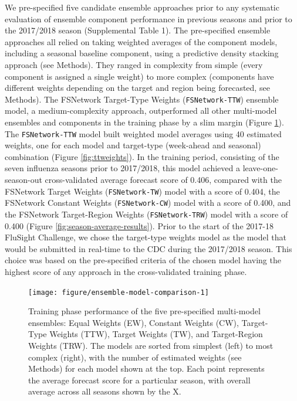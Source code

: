\documentclass{article}\usepackage[]{graphicx}\usepackage[]{color}
\newenvironment{knitrout}{}{} %
\begin{document}
We pre-specified five candidate ensemble approaches prior to any systematic evaluation of ensemble component performance in previous seasons and prior to the 2017/2018 season (Supplemental Table 1).\cite{Reich2017github} 
The pre-specified ensemble approaches all relied on taking weighted averages of the component models, including a seasonal baseline component, using a predictive density stacking approach (see Methods).
They ranged in complexity from simple (every component is assigned a single weight) to more complex (components have different weights depending on the target and region being forecasted, see Methods).
The FSNetwork Target-Type Weights ({\tt FSNetwork-TTW}) ensemble model, a medium-complexity approach, outperformed all other multi-model ensembles and components in the training phase by a slim margin (Figure \ref{fig:ensemble-model-comparison}). 
The {\tt FSNetwork-TTW} model built weighted model averages using 40 estimated weights, one for each model and target-type (week-ahead and seasonal) combination (Figure \ref{fig:ttweights}).
In the training period, consisting of the seven influenza seasons prior to 2017/2018, this model achieved a leave-one-season-out cross-validated average forecast score of 
0.406, 
compared with 
the FSNetwork Target Weights ({\tt FSNetwork-TW}) model with a score of 0.404, 
the FSNetwork Constant Weights ({\tt FSNetwork-CW}) model with a score of 0.400, and 
the FSNetwork Target-Region Weights ({\tt FSNetwork-TRW}) model with a score of 0.400 (Figure \ref{fig:season-average-results}).
Prior to the start of the 2017-18 FluSight Challenge, we chose the target-type weights model as the model that would be submitted in real-time to the CDC during the 2017/2018 season. 
This choice was based on the pre-specified criteria of the chosen model having the highest score of any approach in the cross-validated training phase.\cite{Reich2017github}

\begin{knitrout}
\color{fgcolor}\begin{figure}
\texttt{[image: figure/ensemble-model-comparison-1]} \caption[Training phase performance of the five pre-specified multi-model ensembles]{Training phase performance of the five pre-specified multi-model ensembles: Equal Weights (EW), Constant Weights (CW), Target-Type Weights (TTW), Target Weights (TW), and Target-Region Weights (TRW). The models are sorted from simplest (left) to most complex (right), with the number of estimated weights (see Methods) for each model shown at the top. Each point represents the average forecast score for a particular season, with overall average across all seasons shown by the X. }\label{fig:ensemble-model-comparison}
\end{figure}


\end{knitrout}
\end{document}
